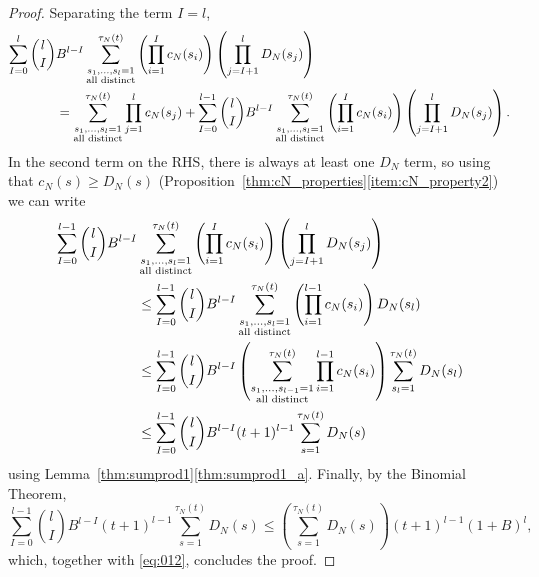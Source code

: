 \begin{proof}
Separating the term $I=l$,
\begin{align}
\sum_{I=0}^l \binom{l}{I} &B^{l-I} 
        \sum_{\substack{ s_1, \dots, s_l =1 \\ \text{all distinct} }}^{\tau_N(t)}
        \left( \prod_{i=1}^I c_N(s_i) \right)
        \left( \prod_{j=I+1}^l D_N(s_j) \right) \notag\\
&= \sum_{\substack{ s_1, \dots, s_l =1 \\ \text{all distinct} }}^{\tau_N(t)}
        \prod_{j=1}^l c_N(s_j)
    + \sum_{I=0}^{l-1} \binom{l}{I} B^{l-I} 
        \sum_{\substack{ s_1, \dots, s_l =1 \\ \text{all distinct} }}^{\tau_N(t)}
        \left( \prod_{i=1}^I c_N(s_i) \right) \left( \prod_{j=I+1}^l D_N(s_j) \right). \label{eq:012}
\end{align}
In the second term on the RHS, there is always at least one $D_N$ term, so using that $c_N(s) \geq D_N(s)$ (Proposition~\ref{thm:cN_properties}\ref{item:cN_property2}) we can write
\begin{align}
\sum_{I=0}^{l-1}\binom{l}{I} B^{l-I} 
        &\sum_{\substack{ s_1, \dots, s_l =1 \\ \text{all distinct} }}^{\tau_N(t)}
        \left( \prod_{i=1}^I c_N(s_i) \right) \left( \prod_{j=I+1}^l D_N(s_j) \right) \notag\\
&\leq \sum_{I=0}^{l-1}\binom{l}{I} B^{l-I} 
        \sum_{\substack{ s_1, \dots, s_l =1 \\ \text{all distinct} }}^{\tau_N(t)}
        \left( \prod_{i=1}^{l-1} c_N(s_i) \right) D_N(s_l) \notag\\
&\leq \sum_{I=0}^{l-1}\binom{l}{I} B^{l-I} 
        \left( \sum_{\substack{ s_1, \dots, s_{l-1} =1 \\ \text{all distinct} }}^{\tau_N(t)}
        \prod_{i=1}^{l-1} c_N(s_i) \right) 
        \sum_{s_l=1}^{\tau_N(t)} D_N(s_l) \notag\\
&\leq \sum_{I=0}^{l-1}\binom{l}{I} B^{l-I} (t+1)^{l-1}
        \sum_{s=1}^{\tau_N(t)} D_N(s) \label{eq:013}
\end{align}
using Lemma~\ref{thm:sumprod1}\ref{thm:sumprod1_a}.
Finally, by the Binomial Theorem,
\begin{equation}\label{eq:014}
\sum_{I=0}^{l-1}\binom{l}{I} B^{l-I} (t+1)^{l-1}
        \sum_{s=1}^{\tau_N(t)} D_N(s)
\leq \left( \sum_{s=1}^{\tau_N(t)} D_N(s) \right) (t+1)^{l-1} (1+B)^l ,
\end{equation}
which, together with \eqref{eq:012}, concludes the proof.
\end{proof}


